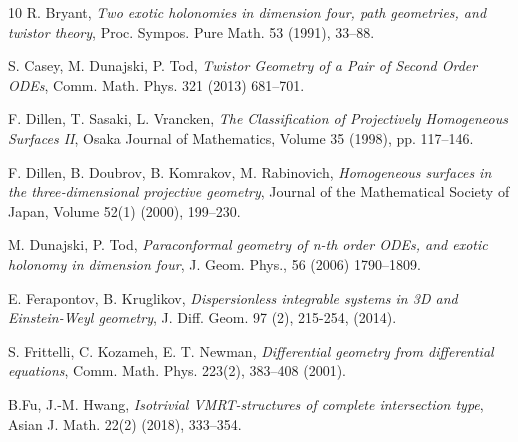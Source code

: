 \documentclass[11pt]{amsart}
\theoremstyle{definition}
\begin{document}
\begin{thebibliography}{10}
 R. Bryant, \textit{Two exotic holonomies in dimension four, path geometries, and twistor theory}, Proc. Sympos. Pure Math. 53 (1991), 33--88.

 S. Casey, M. Dunajski, P. Tod, \textit{Twistor Geometry of a Pair of Second Order ODEs}, Comm. Math. Phys. 321 (2013) 681--701.

 F. Dillen, T. Sasaki, L. Vrancken, \textit{The Classification of Projectively Homogeneous Surfaces II}, Osaka Journal of Mathematics, Volume 35 (1998), pp. 117--146.

 F. Dillen, B. Doubrov, B. Komrakov, M. Rabinovich, \textit{Homogeneous surfaces in the three‑dimensional projective geometry},  Journal of the Mathematical Society of Japan, Volume 52(1) (2000), 199--230.



 M. Dunajski, P. Tod, \textit{Paraconformal geometry of n-th order ODEs, and exotic holonomy in dimension four}, J. Geom. Phys., 56 (2006) 1790--1809.


  E. Ferapontov, B. Kruglikov, \textit{Dispersionless integrable systems in 3D and Einstein-Weyl geometry}, J. Diff. Geom. 97 (2), 215-254, (2014).

 S. Frittelli, C. Kozameh, E. T. Newman, \textit{Differential geometry from differential equations}, Comm. Math. Phys. 223(2), 383--408 (2001).

 B.Fu, J.-M. Hwang, \textit{Isotrivial VMRT-structures of complete intersection type}, Asian J. Math. 22(2) (2018), 333--354.



\end{thebibliography}
\end{document}
